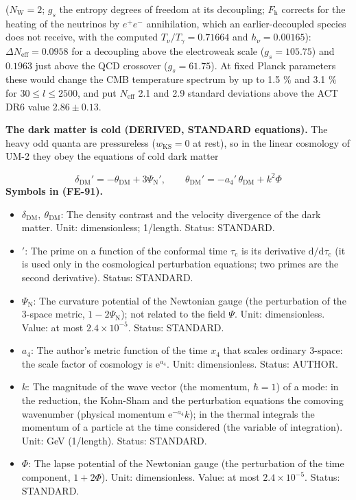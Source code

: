 \documentclass[
  10pt,
]{article}
\providecommand{\tightlist}{%
  \setlength{\itemsep}{0pt}\setlength{\parskip}{0pt}}
\begin{document}
(\(N_{\mathrm{W}} = 2\); \(g_s\) the entropy degrees of freedom at its
decoupling; \(F_{\mathrm{h}}\) corrects for the heating of the neutrinos
by \(e^+e^-\) annihilation, which an earlier-decoupled species does not
receive, with the computed \(T_\nu/T_\gamma = 0.71664\) and
\(h_\nu = 0.00165\)): \(\Delta N_{\mathrm{eff}} = 0.0958\) for a
decoupling above the electroweak scale (\(g_s = 105.75\)) and \(0.1963\)
just above the QCD crossover (\(g_s = 61.75\)). At fixed Planck
parameters these would change the CMB temperature spectrum by up to 1.5
\% and 3.1 \% for \(30 \le l \le 2500\), and put \(N_{\mathrm{eff}}\)
2.1 and 2.9 standard deviations above the ACT DR6 value
\(2.86 \pm 0.13\).

\textbf{The dark matter is cold (DERIVED, STANDARD equations).} The
heavy odd quanta are pressureless (\(w_{\mathrm{KS}} = 0\) at rest), so
in the linear cosmology of UM-2 they obey the equations of cold dark
matter

\[
\delta_{\mathrm{DM}}' = -\theta_{\mathrm{DM}} + 3\Psi_{\mathrm{N}}',\qquad \theta_{\mathrm{DM}}' =
 -a_4'\,\theta_{\mathrm{DM}} + k^2\Phi \tag{FE-91}
\] \textbf{Symbols in (FE-91).}

\begin{itemize}
\tightlist
\item
  \(\delta_{\mathrm{DM}},\ \theta_{\mathrm{DM}}\): The density contrast
  and the velocity divergence of the dark matter. Unit: dimensionless;
  1/length. Status: STANDARD.
\item
  \({}'\): The prime on a function of the conformal time
  \(\tau_{\mathrm{c}}\) is its derivative
  \(\mathrm{d}/\mathrm{d}\tau_{\mathrm{c}}\) (it is used only in the
  cosmological perturbation equations; two primes are the second
  derivative). Status: STANDARD.
\item
  \(\Psi_{\mathrm{N}}\): The curvature potential of the Newtonian gauge
  (the perturbation of the 3-space metric, \(1 - 2\Psi_{\mathrm{N}}\));
  not related to the field \(\Psi\). Unit: dimensionless. Value: at most
  \(2.4\times10^{-5}\). Status: STANDARD.
\item
  \(a_4\): The author's metric function of the time \(x_4\) that scales
  ordinary 3-space: the scale factor of cosmology is
  \(\mathrm{e}^{a_4}\). Unit: dimensionless. Status: AUTHOR.
\item
  \(k\): The magnitude of the wave vector (the momentum, \(\hbar = 1\))
  of a mode: in the reduction, the Kohn-Sham and the perturbation
  equations the comoving wavenumber (physical momentum
  \(\mathrm{e}^{-a_4}k\)); in the thermal integrals the momentum of a
  particle at the time considered (the variable of integration). Unit:
  GeV (1/length). Status: STANDARD.
\item
  \(\Phi\): The lapse potential of the Newtonian gauge (the perturbation
  of the time component, \(1 + 2\Phi\)). Unit: dimensionless. Value: at
  most \(2.4\times10^{-5}\). Status: STANDARD.
\end{itemize}
\end{document}
